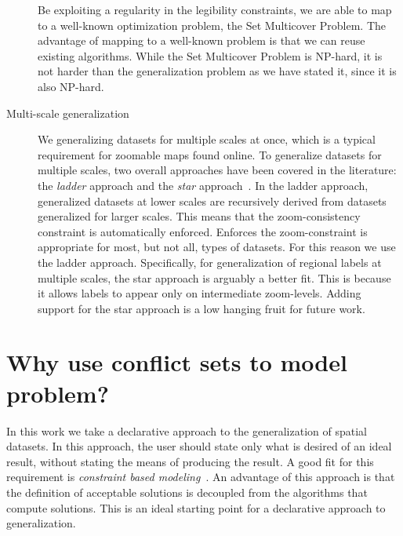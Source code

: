 \documentclass[11pt, oneside]{article}   	%
\begin{document}
\begin{description}
Be exploiting a regularity in the legibility constraints, we are able to map to a well-known optimization problem, the Set Multicover Problem. The advantage of mapping to a well-known problem is that we can reuse existing algorithms. While the Set Multicover Problem is NP-hard, it is not harder than the generalization problem as we have stated it, since it is also NP-hard.

\item[Multi-scale generalization] We generalizing datasets for multiple scales at once, which is a typical requirement for zoomable maps found online. To generalize datasets for multiple scales, two overall approaches have been covered in the literature: the \emph{ladder} approach and the \emph{star} approach~\cite{foerster2010challenges}. In the ladder approach, generalized datasets at lower scales are recursively derived from datasets generalized for larger scales. This means that the zoom-consistency constraint is automatically enforced. Enforces the zoom-constraint is appropriate for most, but not all, types of datasets. For this reason we use the ladder approach. Specifically, for generalization of regional labels at multiple scales, the star approach is arguably a better fit. This is because it allows labels to appear only on intermediate zoom-levels. Adding support for the star approach is a low hanging fruit for future work.  
\end{description}

\section{Why use conflict sets to model problem?}



In this work we take a declarative approach to the generalization of spatial datasets. In this approach, the user should state only what is desired of an ideal result, without stating the means of producing the result. A good fit for this requirement is \emph{constraint based modeling}~\cite{beard1991constraints,harrie1999constraint}. An advantage of this approach is that the definition of acceptable solutions is decoupled from the algorithms that compute solutions. This is an ideal starting point for a declarative approach to generalization.
\end{document}
